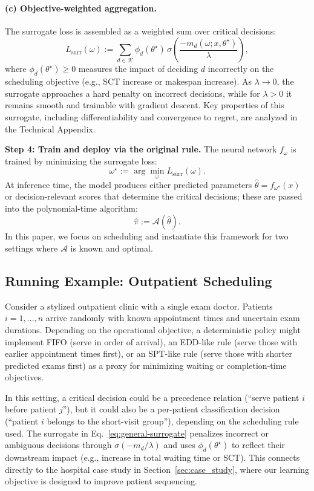 \documentclass{article}
\begin{document}
\paragraph{(c) Objective-weighted aggregation.}
The surrogate loss is assembled as a weighted sum over critical decisions:
\begin{equation}
\label{eq:general-surrogate}
L_{\mathrm{surr}}(\omega)
:=
\sum_{d \in \mathcal{K}}
\phi_d(\theta^\star)\,
\sigma\!\left(
\frac{-m_d(\omega;x,\theta^\star)}{\lambda}
\right),
\end{equation}
where $\phi_d(\theta^\star)\ge 0$ measures the impact of deciding $d$ incorrectly
on the scheduling objective (e.g., SCT increase or makespan increase).
As $\lambda \to 0$, the surrogate approaches a hard penalty on incorrect
decisions, while for $\lambda>0$ it remains smooth and trainable with gradient
descent.
Key properties of this surrogate, including differentiability and convergence to regret, are analyzed in the Technical Appendix.

\noindent\textbf{Step 4: Train and deploy via the original rule.}
The neural network $f_\omega$ is trained by minimizing the surrogate loss:
\[
\omega^\star
:= 
\arg\min_{\omega}
L_{\mathrm{surr}}(\omega).
\]
At inference time, the model produces either predicted parameters
$\hat{\theta}=f_{\omega^\star}(x)$ or decision-relevant scores that determine
the critical decisions; these are passed into the polynomial-time algorithm:
\[
\hat{\pi}
:=
\mathcal{A}(\hat{\theta}).
\]
In this paper, we focus on scheduling and instantiate this framework for two
settings where $\mathcal{A}$ is known and optimal.


\subsection{Running Example: Outpatient Scheduling}
\label{sec:framework-running-example}
Consider a stylized outpatient clinic with a single exam doctor.
Patients $i=1,\dots,n$ arrive randomly with known appointment times and
uncertain exam durations.
Depending on the operational objective, a deterministic policy might implement
FIFO (serve in order of arrival), an EDD-like rule (serve those with earlier appointment times first), or 
an SPT-like rule (serve those with shorter predicted exams
first) as a proxy for minimizing waiting or completion-time objectives.

In this setting, a critical decision could be a precedence relation (``serve
patient $i$ before patient $j$''), but it could also be a per-patient
classification decision (``patient $i$ belongs to the short-visit group''),
depending on the scheduling rule used.
The surrogate in Eq.~\eqref{eq:general-surrogate} penalizes incorrect or ambiguous
decisions through $\sigma(-m_d/\lambda)$ and uses $\phi_d(\theta^\star)$ to reflect
their downstream impact (e.g., increase in total waiting time or SCT).
This connects directly to the hospital case study in
Section~\ref{sec:case_study}, where our learning objective is designed to
improve patient sequencing.
\end{document}
